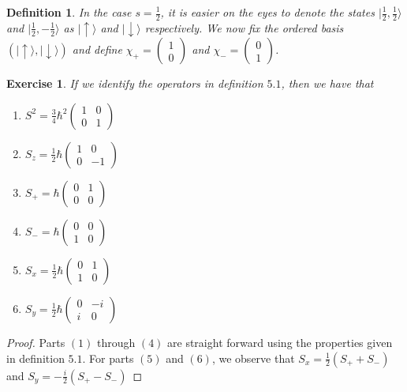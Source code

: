 \documentclass[12pt]{amsart}
\newtheorem{defn}[thm]{Definition}
\newtheorem{ex}[thm]{Exercise}
\renewcommand{\r}{\rangle}
\newcommand{\up}{|\uparrow  \r}
\newcommand{\dn}{|\downarrow  \r}
\begin{document}
\begin{defn}
In the case $s = \frac{1}{2}$, it is easier on the eyes to denote the states $|\frac{1}{2}, \frac{1}{2} \r$ and $|\frac{1}{2}, -\frac{1}{2} \r$ as $\up$ and $\dn$ respectively. We now fix the ordered basis $(\up, \dn)$ and define $\chi_+ = \begin{pmatrix}
1 \\ 0
\end{pmatrix}$ and $\chi_- = \begin{pmatrix}
0 \\ 1
\end{pmatrix}$.   
\end{defn}

\begin{ex}
If we identify the operators in definition $5.1$, then we have that 
\begin{enumerate}
\item $S^2 = \frac{3}{4}\hbar^2 \begin{pmatrix}
1& 0 \\0& 1 
\end{pmatrix}$
\item $S_z = \frac{1}{2}\hbar \begin{pmatrix}
1& 0 \\
0& -1
\end{pmatrix}$
\item $S_{+} = \hbar \begin{pmatrix}
0 & 1\\
0 & 0
\end{pmatrix}$
\item $S_- = \hbar \begin{pmatrix}
0 & 0 \\
1 & 0
\end{pmatrix}$
\item $S_x = \frac{1}{2}\hbar \begin{pmatrix}
0 & 1 \\
1 & 0
\end{pmatrix}$ 
\item $S_y = \frac{1}{2}\hbar \begin{pmatrix}
0 & -i \\
i & 0
\end{pmatrix}$ 
\end{enumerate}
\end{ex}

\begin{proof}
Parts $(1)$ through $(4)$ are straight forward using the properties given in definition $5.1$. For parts $(5)$ and $(6)$, we observe that $S_x = \frac{1}{2}(S_+ +S_-)$ and $S_y = -\frac{i}{2}(S_+ - S_-)$
\end{proof}
\end{document}
